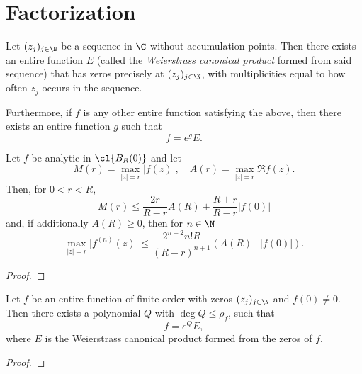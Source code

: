 \chapter{Factorization}
\label{ch:factorization}



\begin{theorem} [Weierstrass] \label{thm:weierstrass}
    Let $(z_j)_{j \in \N}$ be a sequence in $\C$ without accumulation points. Then there exists an entire function $E$ (called the \emph{Weierstrass canonical product} formed from said sequence) that has zeros precisely at $(z_j)_{j \in \N}$, with multiplicities equal to how often $z_j$ occurs in the sequence.

    Furthermore, if $f$ is any other entire function satisfying the above, then there exists an entire function $g$ such that
    $$ f = e^g E. $$
\end{theorem}


\begin{lemma} \label{lem:borel-caratheodory}
    Let $f$ be analytic in $\cl{B_{R}(0)}$ and let
    $$ M(r) = \max_{\vert z \vert = r} \vert f(z) \vert, \quad A(r) = \max_{\vert z \vert = r} \Re f(z). $$
    Then, for $0 < r < R$,
    $$ M(r) \leq \frac{2r}{R - r} A(R) + \frac{R + r}{R - r} \vert f(0) \vert $$
    and, if additionally $A(R) \geq 0$, then for $n \in \N$
    $$ \max_{\vert z \vert = r} \vert f^{(n)}(z) \vert \leq \frac{2^{n+2} n! R}{(R - r)^{n+1}} (A(R) + \vert f(0) \vert). $$
\end{lemma}

\begin{proof}
\end{proof}

\begin{theorem}[Hadamard] \label{thm:hadamard}
    Let $f$ be an entire function of finite order with zeros $(z_j)_{j \in \N}$ and $f(0) \neq 0$. Then there exists a polynomial $Q$ with $\deg Q \leq \rho_f$, such that
    $$ f = e^Q E, $$
    where $E$ is the Weierstrass canonical product formed from the zeros of $f$.
\end{theorem}

\begin{proof}
\end{proof}